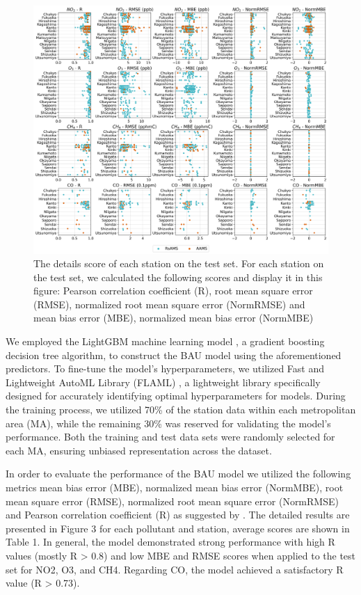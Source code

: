 \begin{figure}[tbh!]
    \centering
    \includegraphics[width=\textwidth]{figs/chap4/fig3.png}
    \caption[Model performance evaluation]{The details score of each station on the test set. For each station on the test set, we calculated the following scores and display it in this figure: Pearson correlation coefficient (R), root mean square error (RMSE), normalized root mean square error (NormRMSE) and mean bias error (MBE), normalized mean bias error (NormMBE)}
    \label{fig:chap4_fig3}
\end{figure}

We employed the LightGBM machine learning model \citep{ke2017lightgbm}, a gradient boosting decision tree algorithm, to construct the BAU model using the aforementioned predictors. To fine-tune the model's hyperparameters, we utilized Fast and Lightweight AutoML Library (FLAML) \citep{wang2021flaml}, a lightweight library specifically designed for accurately identifying optimal hyperparameters for models. During the training process, we utilized 70\% of the station data within each metropolitan area (MA), while the remaining 30\% was reserved for validating the model's performance. Both the training and test data sets were randomly selected for each MA, ensuring unbiased representation across the dataset.\par

In order to evaluate the performance of the BAU model we utilized the following metrics mean bias error (MBE), normalized mean bias error (NormMBE), root mean square error (RMSE), normalized root mean square error (NormRMSE) and Pearson correlation coefficient (R) as suggested by \citep{grange2021covid}. The detailed results are presented in Figure 3 for each pollutant and station, average scores are shown in Table 1. In general, the model demonstrated strong performance with high R values (mostly R > 0.8) and low MBE and RMSE scores when applied to the test set for NO2, O3, and CH4. Regarding CO, the model achieved a satisfactory R value (R > 0.73).\par

